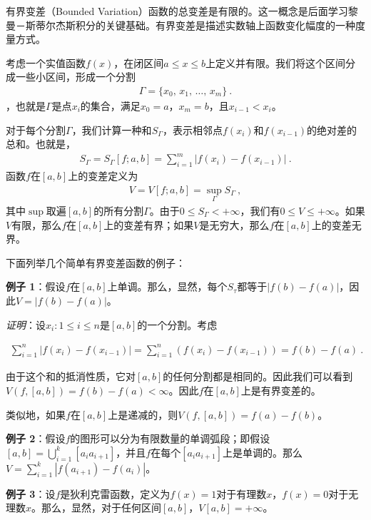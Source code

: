 
有界变差（Bounded Variation）函数的总变差是有限的。这一概念是后面学习黎曼－斯蒂尔杰斯积分的关键基础。有界变差是描述实数轴上函数变化幅度的一种度量方式。

考虑一个实值函数$f(x)$，在闭区间$a\leq x\leq b$上定义并有限。我们将这个区间分成一些小区间，形成一个分割
\begin{align} 
\Gamma=\{x_{0},\,x_{1},\,\ldots,\,x_{m}\} ~.
\end{align}，也就是$\Gamma$是点$x_{i}$的集合，满足$x_{0}=a$，$x_{m}=b$，且$x_{i-1}<x_{i}$。

对于每个分割$\Gamma$，我们计算一种和$S_{\Gamma}$，表示相邻点$f(x_{i})$和$f(x_{i-1})$的绝对差的总和。也就是，
\begin{align} 
S_{\Gamma}=S_{\Gamma}[f;a,b]=\sum_{i=1}^{m}|f(x_{i})-f(x_{i-1})|~.
\end{align}
函数$f$在$[a,b]$上的变差定义为
\begin{align} 
V=V[f;a,b]=\sup_{\Gamma}S_{\Gamma}~, 
\end{align}
其中$\sup$取遍$[a,b]$的所有分割$\Gamma$。由于$0\leq S_{\Gamma}<+\infty$，我们有$0\leq V\leq+\infty$。如果$V$有限，那么$f$在$[a,b]$上的变差有界；如果$V$是无穷大，那么$f$在$[a,b]$上的变差无界。

下面列举几个简单有界变差函数的例子：

\textbf{例子 1}：假设$f$在$[a,b]$上单调。那么，显然，每个$S_{\tau}$都等于$|f(b)-f(a)|$，因此$V=|f(b)-f(a)|$。

\textsl{证明}：设${x_{i}:1\leq i\leq n}$是$[a,b]$的一个分割。考虑

\begin{align} \sum_{i=1}^{n}|f(x_{i})-f(x_{i-1})|=\sum_{i=1}^{n}\left(f(x_{i})-f(x_{i-1})\right)=f(b)-f(a)~. \end{align}

由于这个和的抵消性质，它对$[a,b]$的任何分割都是相同的。因此我们可以看到$V(f,[a,b])=f(b)-f(a)<\infty$。因此$f$在$[a,b]$上是有界变差的。

类似地，如果$f$在$[a,b]$上是递减的，则$V(f,[a,b])=f(a)-f(b)$。

\textbf{例子 2}：假设$f$的图形可以分为有限数量的单调弧段；即假设$[a,b]=\bigcup_{i=1}^{k}[a_{i}a_{i+1}]$，并且$f$在每个$[a_{i}a_{i+1}]$上是单调的。那么$V=\sum_{i=1}^{k}|f(a_{i+1})-f(a_{i})|$。

\textbf{例子 3}：设$f$是狄利克雷函数，定义为$f(x)=1$对于有理数$x$，$f(x)=0$对于无理数$x$。那么，显然，对于任何区间$[a,b]$，$V[a,b]=+\infty$。

